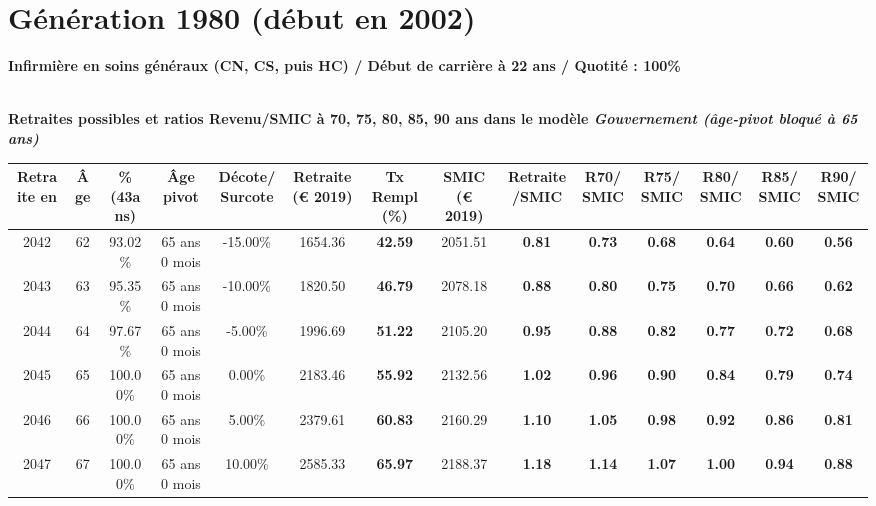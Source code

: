 \newpage 
 
\section{Génération 1980 (début en 2002)\label{Infirmier_100_1980_22_0}} 
 
{\bf \noindent Infirmière en soins généraux (CN, CS, puis HC) / Début de carrière à 22 ans / Quotité : 100\%}  ~ 

 ~\\{\bf \noindent Retraites possibles et ratios Revenu/SMIC à 70, 75, 80, 85, 90 ans dans le modèle \emph{Gouvernement (âge-pivot bloqué à 65 ans)}}  
 
\begin{adjustbox}{max width=\textwidth} 
\begin{tabular}[htb]{|c|c||c|c|c||c|c||c|c||c|c|c|c|c|} 
\hline 
 Retraite en &  Âge &  \%(43ans) &  Âge pivot &  Décote/Surcote &  Retraite (\euro{} 2019) &  Tx Rempl(\%) &  SMIC (\euro{} 2019) &  Retraite/SMIC &  R70/SMIC &  R75/SMIC &  R80/SMIC &  R85/SMIC &  R90/SMIC \\ 
\hline \hline 
 2042 &  62 &  93.02\% &  65 ans 0 mois &  -15.00\% &  1654.36 &  {\bf 42.59} &  2051.51 &  {\bf {\color{red} 0.81}} &  {\bf {\color{red} 0.73}} &  {\bf {\color{red} 0.68}} &  {\bf {\color{red} 0.64}} &  {\bf {\color{red} 0.60}} &  {\bf {\color{red} 0.56}} \\ 
\hline 
 2043 &  63 &  95.35\% &  65 ans 0 mois &  -10.00\% &  1820.50 &  {\bf 46.79} &  2078.18 &  {\bf {\color{red} 0.88}} &  {\bf {\color{red} 0.80}} &  {\bf {\color{red} 0.75}} &  {\bf {\color{red} 0.70}} &  {\bf {\color{red} 0.66}} &  {\bf {\color{red} 0.62}} \\ 
\hline 
 2044 &  64 &  97.67\% &  65 ans 0 mois &  -5.00\% &  1996.69 &  {\bf 51.22} &  2105.20 &  {\bf {\color{red} 0.95}} &  {\bf {\color{red} 0.88}} &  {\bf {\color{red} 0.82}} &  {\bf {\color{red} 0.77}} &  {\bf {\color{red} 0.72}} &  {\bf {\color{red} 0.68}} \\ 
\hline 
 2045 &  65 &  100.00\% &  65 ans 0 mois &  0.00\% &  2183.46 &  {\bf 55.92} &  2132.56 &  {\bf 1.02} &  {\bf {\color{red} 0.96}} &  {\bf {\color{red} 0.90}} &  {\bf {\color{red} 0.84}} &  {\bf {\color{red} 0.79}} &  {\bf {\color{red} 0.74}} \\ 
\hline 
 2046 &  66 &  100.00\% &  65 ans 0 mois &  5.00\% &  2379.61 &  {\bf 60.83} &  2160.29 &  {\bf 1.10} &  {\bf 1.05} &  {\bf {\color{red} 0.98}} &  {\bf {\color{red} 0.92}} &  {\bf {\color{red} 0.86}} &  {\bf {\color{red} 0.81}} \\ 
\hline 
 2047 &  67 &  100.00\% &  65 ans 0 mois &  10.00\% &  2585.33 &  {\bf 65.97} &  2188.37 &  {\bf 1.18} &  {\bf 1.14} &  {\bf 1.07} &  {\bf {\color{red} 1.00}} &  {\bf {\color{red} 0.94}} &  {\bf {\color{red} 0.88}} \\ 
\hline 
\hline 
\end{tabular} 
\end{adjustbox} 
 
